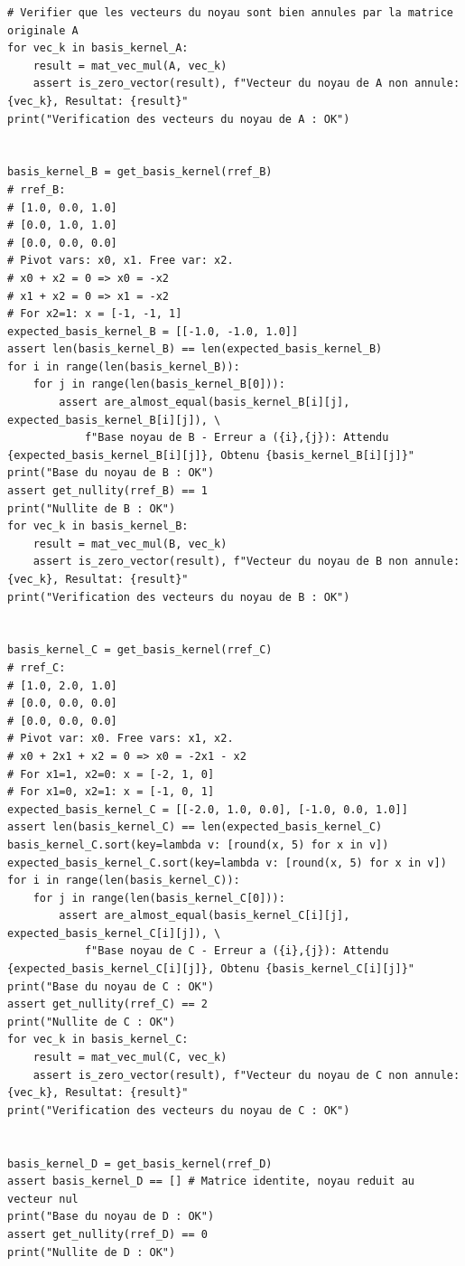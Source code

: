 \documentclass{report}
\begin{document}
\begin{verbatim}
# Verifier que les vecteurs du noyau sont bien annules par la matrice originale A
for vec_k in basis_kernel_A:
    result = mat_vec_mul(A, vec_k)
    assert is_zero_vector(result), f"Vecteur du noyau de A non annule: {vec_k}, Resultat: {result}"
print("Verification des vecteurs du noyau de A : OK")


basis_kernel_B = get_basis_kernel(rref_B)
# rref_B:
# [1.0, 0.0, 1.0]
# [0.0, 1.0, 1.0]
# [0.0, 0.0, 0.0]
# Pivot vars: x0, x1. Free var: x2.
# x0 + x2 = 0 => x0 = -x2
# x1 + x2 = 0 => x1 = -x2
# For x2=1: x = [-1, -1, 1]
expected_basis_kernel_B = [[-1.0, -1.0, 1.0]]
assert len(basis_kernel_B) == len(expected_basis_kernel_B)
for i in range(len(basis_kernel_B)):
    for j in range(len(basis_kernel_B[0])):
        assert are_almost_equal(basis_kernel_B[i][j], expected_basis_kernel_B[i][j]), \
            f"Base noyau de B - Erreur a ({i},{j}): Attendu {expected_basis_kernel_B[i][j]}, Obtenu {basis_kernel_B[i][j]}"
print("Base du noyau de B : OK")
assert get_nullity(rref_B) == 1
print("Nullite de B : OK")
for vec_k in basis_kernel_B:
    result = mat_vec_mul(B, vec_k)
    assert is_zero_vector(result), f"Vecteur du noyau de B non annule: {vec_k}, Resultat: {result}"
print("Verification des vecteurs du noyau de B : OK")


basis_kernel_C = get_basis_kernel(rref_C)
# rref_C:
# [1.0, 2.0, 1.0]
# [0.0, 0.0, 0.0]
# [0.0, 0.0, 0.0]
# Pivot var: x0. Free vars: x1, x2.
# x0 + 2x1 + x2 = 0 => x0 = -2x1 - x2
# For x1=1, x2=0: x = [-2, 1, 0]
# For x1=0, x2=1: x = [-1, 0, 1]
expected_basis_kernel_C = [[-2.0, 1.0, 0.0], [-1.0, 0.0, 1.0]]
assert len(basis_kernel_C) == len(expected_basis_kernel_C)
basis_kernel_C.sort(key=lambda v: [round(x, 5) for x in v])
expected_basis_kernel_C.sort(key=lambda v: [round(x, 5) for x in v])
for i in range(len(basis_kernel_C)):
    for j in range(len(basis_kernel_C[0])):
        assert are_almost_equal(basis_kernel_C[i][j], expected_basis_kernel_C[i][j]), \
            f"Base noyau de C - Erreur a ({i},{j}): Attendu {expected_basis_kernel_C[i][j]}, Obtenu {basis_kernel_C[i][j]}"
print("Base du noyau de C : OK")
assert get_nullity(rref_C) == 2
print("Nullite de C : OK")
for vec_k in basis_kernel_C:
    result = mat_vec_mul(C, vec_k)
    assert is_zero_vector(result), f"Vecteur du noyau de C non annule: {vec_k}, Resultat: {result}"
print("Verification des vecteurs du noyau de C : OK")


basis_kernel_D = get_basis_kernel(rref_D)
assert basis_kernel_D == [] # Matrice identite, noyau reduit au vecteur nul
print("Base du noyau de D : OK")
assert get_nullity(rref_D) == 0
print("Nullite de D : OK")



\end{verbatim}
\end{document}
